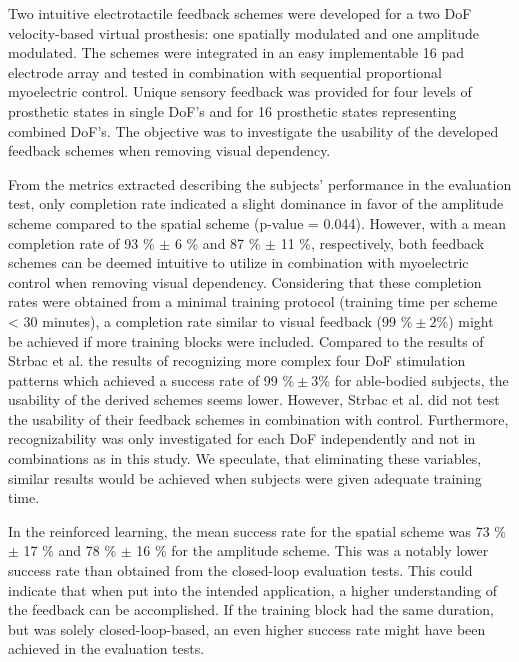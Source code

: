 Two intuitive electrotactile feedback schemes were developed for a two DoF velocity-based virtual prosthesis: one spatially modulated and one amplitude modulated. The schemes were integrated in an easy implementable 16 pad electrode array and tested in combination with sequential proportional myoelectric control. Unique sensory feedback was provided for four levels of prosthetic states in single DoF's and for 16 prosthetic states representing combined DoF's. The objective was to investigate the usability of the developed feedback schemes when removing visual dependency.

From the metrics extracted describing the subjects' performance in the evaluation test, only completion rate indicated a slight  dominance in favor of the amplitude scheme compared to the spatial scheme (p-value = 0.044). However, with a mean completion rate of 93 \% $\pm$ 6 \% and 87 \% $\pm$ 11 \%, respectively, both feedback schemes can be deemed intuitive to utilize in combination with myoelectric control when removing visual dependency. Considering that these completion rates were obtained from a minimal training protocol (training time per scheme < 30 minutes), a completion rate similar to visual feedback (99 $\% \pm 2\%$) might be achieved if more training blocks were included.
Compared to the results of Strbac et al. \cite{Strbac2016} the results of recognizing more complex four DoF stimulation patterns which achieved a success rate of 99 $\% \pm 3\%$ for able-bodied subjects, the usability of the derived schemes seems lower. However, Strbac et al. did not test the usability of their feedback schemes in combination with control. Furthermore, recognizability was only investigated for each DoF independently and not in combinations as in this study. We speculate, that eliminating these variables, similar results would be achieved when subjects were given adequate training time.       

In the reinforced learning, the mean success rate for the spatial scheme was 73 \%  $\pm$ 17 \% and 78 \%  $\pm$ 16 \% for the amplitude scheme. This was a notably lower success rate than obtained from the closed-loop evaluation tests. This could indicate that when put into the intended application, a higher understanding of the feedback can be accomplished. If the training block had the same duration, but was solely closed-loop-based, an even higher success rate might have been achieved in the evaluation tests. 

